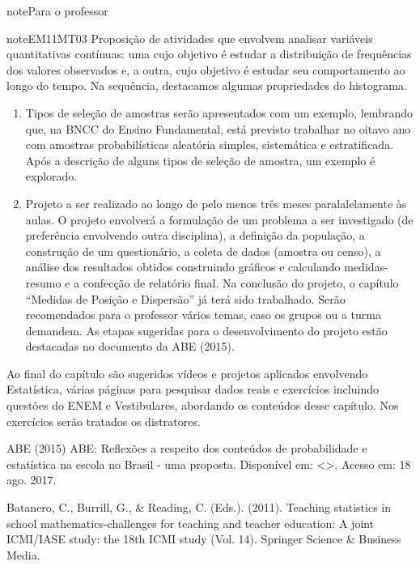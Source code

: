 \begin{sphinxadmonition}{note}{Para o professor}
\begin{sphinxadmonition}{note}{EM11MT03}
 Proposição de atividades que envolvem analisar variáveis quantitativas contínuas: uma cujo objetivo é estudar a distribuição de frequências dos valores observados e, a outra, cujo objetivo é estudar seu comportamento ao longo do tempo. Na sequência, destacamos algumas propriedades do histograma.

\begin{enumerate}
\item {} 
Tipos de seleção de amostras serão apresentados com um exemplo, lembrando que, na BNCC do Ensino Fundamental, está previsto trabalhar no oitavo ano com amostras probabilísticas aleatória simples, sistemática e estratificada. Após a descrição de alguns tipos de seleção de amostra, um exemplo é explorado.

\item {} 
Projeto a ser realizado ao longo de pelo menos três meses paralalelamente às aulas. O projeto envolverá a formulação de um problema a ser investigado (de preferência envolvendo outra disciplina), a definição da população, a construção de um questionário, a coleta de dados (amostra ou censo), a análise dos resultados obtidos construindo gráficos e calculando medidas-resumo e a confecção de relatório final. Na conclusão do projeto, o capítulo ``Medidas de Posição e Dispersão'' já terá sido trabalhado. Serão recomendados para o professor vários temas, caso os grupos ou a turma demandem. As etapas sugeridas para o desenvolvimento do projeto estão destacadas no documento da ABE (2015).

\end{enumerate}

Ao final do capítulo são sugeridos vídeos e projetos aplicados envolvendo  Estatística, várias páginas para pesquisar dados reais e exercícios incluindo questões do ENEM e Vestibulares, abordando os conteúdos desse capítulo. Nos exercícios serão tratados os distratores.

ABE (2015) ABE: Reflexões a respeito dos conteúdos de probabilidade e estatística na escola no Brasil - uma proposta. Disponível em: \textless{}\textgreater{}. Acesso em: 18 ago. 2017.

Batanero, C., Burrill, G., \& Reading, C. (Eds.). (2011). Teaching statistics in school mathematics-challenges for teaching and teacher education: A joint ICMI/IASE study: the 18th ICMI study (Vol. 14). Springer Science \& Business Media.


\end{sphinxadmonition}
\end{sphinxadmonition}
